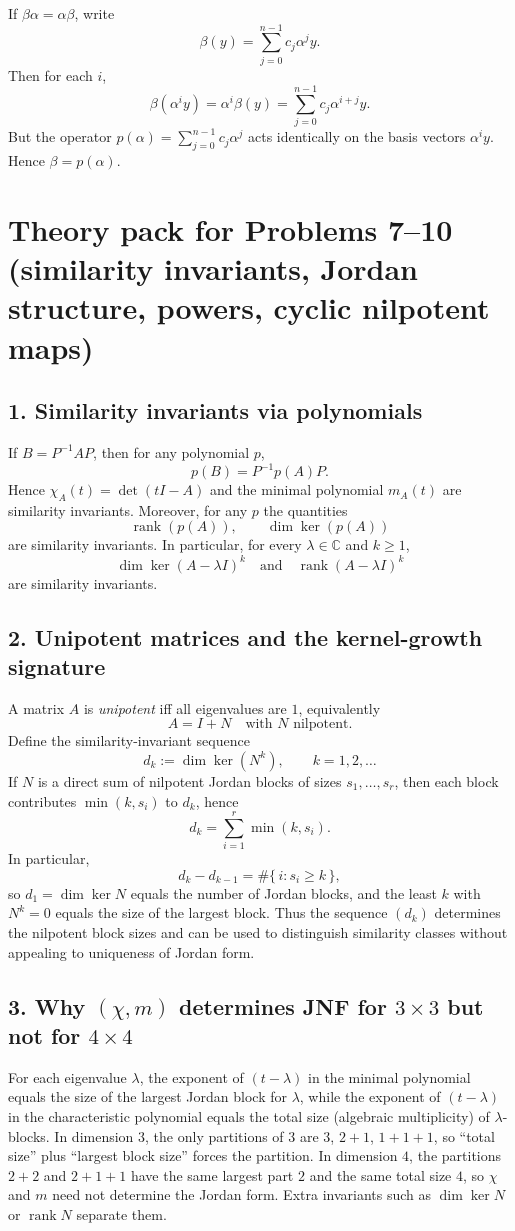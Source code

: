 \documentclass[12pt,a4paper]{article}
\theoremstyle{plain}
\theoremstyle{definition}      %
\begin{document}
If $\beta\alpha=\alpha\beta$, write
\[
\beta(y)=\sum_{j=0}^{n-1} c_j \alpha^j y.
\]
Then for each $i$,
\[
\beta(\alpha^i y)=\alpha^i\beta(y)=\sum_{j=0}^{n-1} c_j \alpha^{i+j}y.
\]
But the operator $p(\alpha)=\sum_{j=0}^{n-1} c_j \alpha^j$ acts identically on the basis vectors $\alpha^i y$.
Hence $\beta=p(\alpha)$.

\section*{Theory pack for Problems 7--10 (similarity invariants, Jordan structure, powers, cyclic nilpotent maps)}

\subsection*{1. Similarity invariants via polynomials}
If $B=P^{-1}AP$, then for any polynomial $p$,
\[
p(B)=P^{-1}p(A)P.
\]
Hence $\chi_A(t)=\det(tI-A)$ and the minimal polynomial $m_A(t)$ are similarity invariants.
Moreover, for any $p$ the quantities
\[
\operatorname{rank}(p(A)),\qquad \dim\ker(p(A))
\]
are similarity invariants. In particular, for every $\lambda\in\mathbb C$ and $k\ge 1$,
\[
\dim\ker(A-\lambda I)^k
\quad\text{and}\quad
\operatorname{rank}(A-\lambda I)^k
\]
are similarity invariants.

\subsection*{2. Unipotent matrices and the kernel-growth signature}
A matrix $A$ is \emph{unipotent} iff all eigenvalues are $1$, equivalently
\[
A=I+N
\quad\text{with $N$ nilpotent.}
\]
Define the similarity-invariant sequence
\[
d_k:=\dim\ker(N^k),\qquad k=1,2,\dots
\]
If $N$ is a direct sum of nilpotent Jordan blocks of sizes $s_1,\dots,s_r$, then each block contributes $\min(k,s_i)$ to $d_k$, hence
\[
d_k=\sum_{i=1}^r \min(k,s_i).
\]
In particular,
\[
d_k-d_{k-1}=\#\{\,i : s_i\ge k\,\},
\]
so $d_1=\dim\ker N$ equals the number of Jordan blocks, and the least $k$ with $N^k=0$ equals the size of the largest block.
Thus the sequence $(d_k)$ determines the nilpotent block sizes and can be used to distinguish similarity classes without appealing to uniqueness of Jordan form.

\subsection*{3. Why $(\chi,m)$ determines JNF for $3\times 3$ but not for $4\times 4$}
For each eigenvalue $\lambda$, the exponent of $(t-\lambda)$ in the minimal polynomial equals the size of the largest Jordan block for $\lambda$,
while the exponent of $(t-\lambda)$ in the characteristic polynomial equals the total size (algebraic multiplicity) of $\lambda$-blocks.
In dimension $3$, the only partitions of $3$ are $3$, $2+1$, $1+1+1$, so ``total size'' plus ``largest block size'' forces the partition.
In dimension $4$, the partitions $2+2$ and $2+1+1$ have the same largest part $2$ and the same total size $4$,
so $\chi$ and $m$ need not determine the Jordan form. Extra invariants such as $\dim\ker N$ or $\operatorname{rank}N$ separate them.
\end{document}
